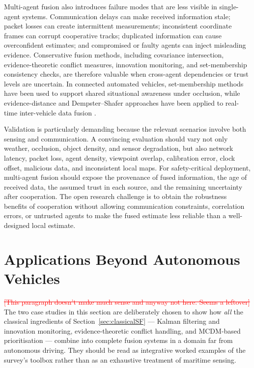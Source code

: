 \documentclass{ieeeaccess}
\newcommand{\added}[1]{\textcolor{RevisionBlue}{#1}}
\newcommand{\deleted}[1]{\textcolor{red}{\sout{#1}}}
\begin{document}
Multi-agent fusion also introduces failure modes that are less visible in single-agent systems. Communication delays can make received information stale; packet losses can create intermittent measurements; inconsistent coordinate frames can corrupt cooperative tracks; duplicated information can cause overconfident estimates; and compromised or faulty agents can inject misleading evidence. Conservative fusion methods, including covariance intersection, evidence-theoretic conflict measures, innovation monitoring, and set-membership consistency checks, are therefore valuable when cross-agent dependencies or trust levels are uncertain. In connected automated vehicles, set-membership methods have been used to support shared situational awareness under occlusion, while evidence-distance and Dempster--Shafer approaches have been applied to real-time inter-vehicle data fusion \cite{narri2021_set_membership_shared_awareness,cho_realtime_2020}.

Validation is particularly demanding because the relevant scenarios involve both sensing and communication. A convincing evaluation should vary not only weather, occlusion, object density, and sensor degradation, but also network latency, packet loss, agent density, viewpoint overlap, calibration error, clock offset, malicious data, and inconsistent local maps. For safety-critical deployment, multi-agent fusion should expose the provenance of fused information, the age of received data, the assumed trust in each source, and the remaining uncertainty after cooperation. The open research challenge is to obtain the robustness benefits of cooperation without allowing communication constraints, correlation errors, or untrusted agents to make the fused estimate less reliable than a well-designed local estimate.

\section{Applications Beyond Autonomous Vehicles}
\label{sec:applications}
\deleted{[This paragraph doesn't make much sense and anyway not here. Seems a leftover]} %
\added{The two case studies in this section are deliberately chosen to show how \emph{all} the classical ingredients of Section~\ref{sec:classicalSF} --- Kalman filtering and innovation monitoring, evidence-theoretic conflict handling, and MCDM-based prioritisation --- combine into complete fusion systems in a domain far from autonomous driving. They should be read as integrative worked examples of the survey's toolbox rather than as an exhaustive treatment of maritime sensing.}
\end{document}
